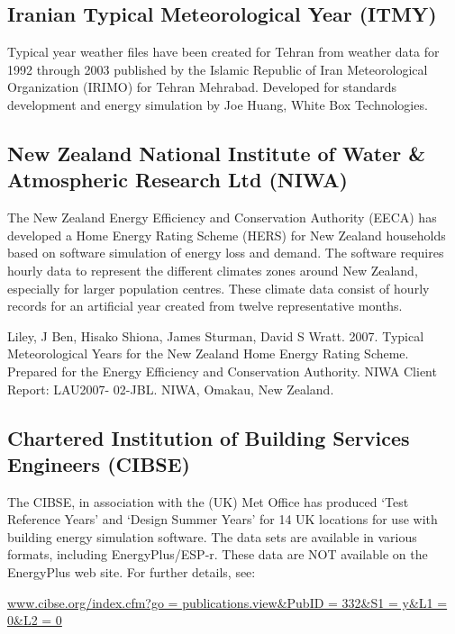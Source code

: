 \subsection{Iranian Typical Meteorological Year (ITMY)}\label{iranian-typical-meteorological-year-itmy}

Typical year weather files have been created for Tehran from weather data for 1992 through 2003 published by the Islamic Republic of Iran Meteorological Organization (IRIMO) for Tehran Mehrabad. Developed for standards development and energy simulation by Joe Huang, White Box Technologies.

\subsection{New Zealand National Institute of Water \& Atmospheric Research Ltd (NIWA)}\label{new-zealand-national-institute-of-water-atmospheric-research-ltd-niwa}

The New Zealand Energy Efficiency and Conservation Authority (EECA) has developed a Home Energy Rating Scheme (HERS) for New Zealand households based on software simulation of energy loss and demand. The software requires hourly data to represent the different climates zones around New Zealand, especially for larger population centres. These climate data consist of hourly records for an artificial year created from twelve representative months.

Liley, J Ben, Hisako Shiona, James Sturman, David S Wratt. 2007. Typical Meteorological Years for the New Zealand Home Energy Rating Scheme. Prepared for the Energy Efficiency and Conservation Authority. NIWA Client Report: LAU2007- 02-JBL. NIWA, Omakau, New Zealand.

\subsection{Chartered Institution of Building Services Engineers (CIBSE)}\label{chartered-institution-of-building-services-engineers-cibse}

The CIBSE, in association with the (UK) Met Office has produced `Test Reference Years' and `Design Summer Years' for 14 UK locations for use with building energy simulation software. The data sets are available in various formats, including EnergyPlus/ESP-r. These data are NOT available on the EnergyPlus web site. For further details, see:

\href{file:///E:/Docs4PDFs/www.cibse.org/index.cfm\%3fgo\%20=\%20publications.view\&PubID\%20=\%20332\&S1\%20=\%20y\&L1\%20=\%200\&L2\%20=\%200}{www.cibse.org/index.cfm?go = publications.view\&PubID = 332\&S1 = y\&L1 = 0\&L2 = 0}

